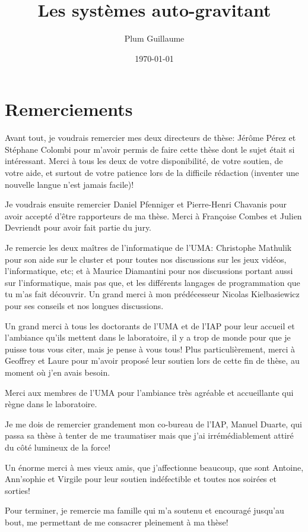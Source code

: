 \documentclass[a4paper,11pt,twoside,openright]{report}
\title{Les systèmes auto-gravitant}
\author{Plum Guillaume}
\date{\today}
\renewcommand{\(}{\ensuremath{\left(}}
\renewcommand{\)}{\ensuremath{\right)}}
\begin{document}
	\dominitoc
	

	\cleardoublepage


	\chapter*{Remerciements}
		Avant tout, je voudrais remercier mes deux directeurs de thèse: Jérôme Pérez et Stéphane Colombi pour
		m'avoir permis de faire cette thèse dont le sujet était si intéressant. Merci à tous les deux de votre
		disponibilité, de votre soutien, de votre aide, et surtout de votre patience lors de la difficile
		rédaction (inventer une nouvelle langue n'est jamais facile)!
		
		Je voudrais ensuite remercier Daniel Pfenniger et Pierre-Henri Chavanis pour avoir accepté d'être
		rapporteurs de ma thèse. Merci à Françoise Combes et Julien Devriendt pour avoir fait partie
		du jury.

		Je remercie les deux maîtres de l'informatique de l'UMA: Christophe Mathulik pour son aide sur le
		cluster et pour toutes nos discussions sur les jeux vidéos, l'informatique, etc; et à Maurice Diamantini
		pour nos discussions portant aussi sur l'informatique, mais pas que, et les différents langages de
		programmation que tu m'as fait découvrir. Un grand merci à mon prédécesseur Nicolas Kielbasiewicz pour
		ses conseils et nos longues discussions.

		Un grand merci à tous les doctorants de l'UMA et de l'IAP pour leur accueil et l'ambiance qu'ils mettent
		dans le laboratoire, il y a trop de monde pour que je puisse tous vous citer, mais je pense à vous tous! Plus
		particulièrement, merci à Geoffrey et Laure pour m'avoir proposé leur soutien lors de cette fin de
		thèse, au moment où j'en avais besoin.

		Merci aux membres de l'UMA pour l'ambiance très agréable et accueillante qui règne dans le laboratoire.

		Je me dois de remercier grandement mon co-bureau de l'IAP, Manuel Duarte, qui passa sa thèse à tenter de
		me traumatiser mais que j'ai irrémédiablement attiré du côté lumineux de la force!

		Un énorme merci à mes vieux amis, que j'affectionne beaucoup, que sont Antoine, Ann'sophie et Virgile
		pour leur soutien indéfectible et toutes nos soirées et sorties!

		Pour terminer, je remercie ma famille qui m'a soutenu et encouragé jusqu'au bout, me permettant de me
		consacrer pleinement à ma thèse!
\end{document}
